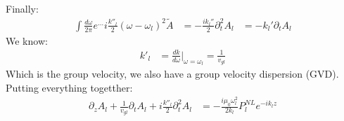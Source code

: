 Finally:
\begin{align*}
	\int\frac{d\omega}{2\pi} e^{\ldots} i\frac{k''_l}{2}(\omega- \omega_l)^2\tilde{A} &= - \frac{ik_l''}{2}\partial_t^2 A_l
	&= -k_l'\partial_t A_l
\end{align*}
We know:
\begin{align*}
	k'_l &= \frac{dk}{d\omega}\Big|_{\omega=\omega_l} = \frac{1}{v_{gl}}
\end{align*}
Which is the group velocity, we also have a group velocity dispersion (GVD). Putting everything togetther:
\begin{align*}
	\partial_z A_l + \frac{1}{v_{gl}} \partial_t A_l + i\frac{k''_l}{2}\partial_t^2 A_l &= -\frac{i\mu_0\omega_l^2}{2k_l} P_l^{NL} e^{-ik_l z}
\end{align*}
